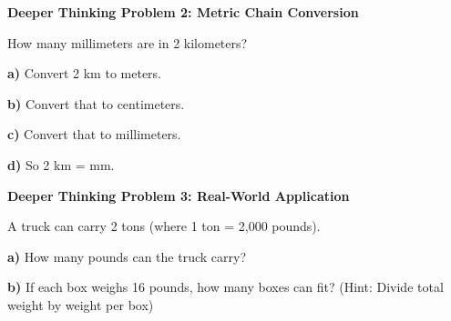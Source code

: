 \documentclass[12pt, letterpaper, fleqn]{article}
\newcommand{\blank}{\underline{\hspace{2.2cm}}}
\begin{document}
\vspace{4mm}

\begin{tcolorbox}[colback=yellow!15, colframe=orange, boxrule=1.5pt, arc=4mm, left=6mm, right=6mm, top=5mm, bottom=5mm]

\textbf{Deeper Thinking Problem 2: Metric Chain Conversion}

\medskip

\noindent
How many millimeters are in 2 kilometers?

\noindent
\textbf{a)} Convert 2 km to meters.

\vspace{1.3cm}

\noindent
\textbf{b)} Convert that to centimeters.

\vspace{1.3cm}

\noindent
\textbf{c)} Convert that to millimeters.

\vspace{1.3cm}

\noindent
\textbf{d)} So 2 km = \blank mm.

\end{tcolorbox}

\newpage

\begin{tcolorbox}[colback=yellow!15, colframe=orange, boxrule=1.5pt, arc=4mm, left=6mm, right=6mm, top=5mm, bottom=5mm]

\textbf{Deeper Thinking Problem 3: Real-World Application}

\medskip

\noindent
A truck can carry 2 tons (where 1 ton = 2,000 pounds).

\noindent
\textbf{a)} How many pounds can the truck carry?

\vspace{1.5cm}

\noindent
\textbf{b)} If each box weighs 16 pounds, how many boxes can fit? (Hint: Divide total weight by weight per box)

\vspace{1.8cm}

\end{tcolorbox}
\end{document}
